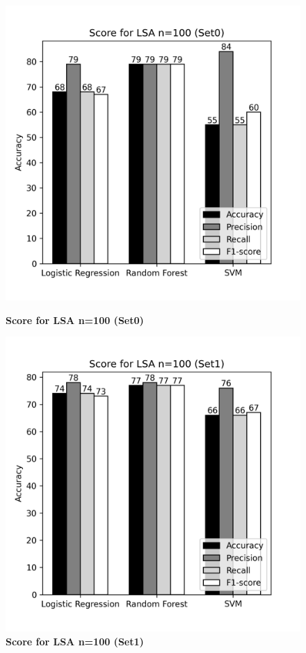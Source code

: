 \documentclass[12pt]{report}
\begin{document}
            \begin{figure}[h]
                \begin{minipage}{0.48\textwidth}
                  \centering
                  \includegraphics[scale=0.55]{plots/Score for LSA n=100 (Set0).png}
                  \caption{\textbf{Score for LSA n=100 (Set0)}}\label{Fig:typo1}
                \end{minipage}\hfill
                \begin{minipage}{0.48\textwidth}
                  \centering
                  \includegraphics[scale=0.55]{plots/Score for LSA n=100 (Set1).png}
                  \caption{\textbf{Score for LSA n=100 (Set1)}}\label{Fig:tyo2}
                \end{minipage}
             \end{figure}
\end{document}
